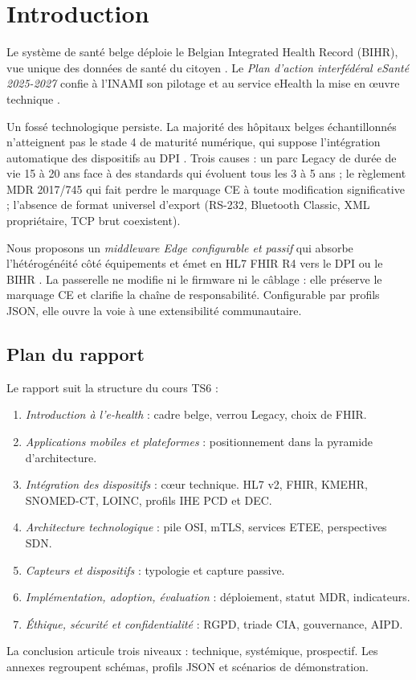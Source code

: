 \chapter*{Introduction}
\label{ch:introduction}

Le système de santé belge déploie le Belgian Integrated Health Record (BIHR), vue unique des données de santé du citoyen \cite{bihr_overview}. Le \emph{Plan d'action interfédéral eSanté 2025-2027} confie à l'INAMI son pilotage et au service eHealth la mise en {\oe}uvre technique \cite{plan_esante_2025_2027,ehealth_services_base}.

Un fossé technologique persiste. La majorité des hôpitaux belges échantillonnés n'atteignent pas le stade 4 de maturité numérique, qui suppose l'intégration automatique des dispositifs au DPI \cite{kce_362_dpi}. Trois causes : un parc Legacy de durée de vie 15 à 20 ans face à des standards qui évoluent tous les 3 à 5 ans ; le règlement MDR 2017/745 qui fait perdre le marquage CE à toute modification significative \cite{mdr_2017_745} ; l'absence de format universel d'export (RS-232, Bluetooth Classic, XML propriétaire, TCP brut coexistent).

Nous proposons un \emph{middleware Edge configurable et passif} qui absorbe l'hétérogénéité côté équipements et émet en HL7 FHIR R4 vers le DPI ou le BIHR \cite{hl7_fhir_r4}. La passerelle ne modifie ni le firmware ni le câblage : elle préserve le marquage CE et clarifie la chaîne de responsabilité. Configurable par profils JSON, elle ouvre la voie à une extensibilité communautaire.

\section*{Plan du rapport}

Le rapport suit la structure du cours TS6 :
\begin{enumerate}
  \item \emph{Introduction à l'e-health} : cadre belge, verrou Legacy, choix de FHIR.
  \item \emph{Applications mobiles et plateformes} : positionnement dans la pyramide d'architecture.
  \item \emph{Intégration des dispositifs} : c{\oe}ur technique. HL7 v2, FHIR, KMEHR, SNOMED-CT, LOINC, profils IHE PCD et DEC.
  \item \emph{Architecture technologique} : pile OSI, mTLS, services ETEE, perspectives SDN.
  \item \emph{Capteurs et dispositifs} : typologie et capture passive.
  \item \emph{Implémentation, adoption, évaluation} : déploiement, statut MDR, indicateurs.
  \item \emph{Éthique, sécurité et confidentialité} : RGPD, triade CIA, gouvernance, AIPD.
\end{enumerate}
La conclusion articule trois niveaux : technique, systémique, prospectif. Les annexes regroupent schémas, profils JSON et scénarios de démonstration.
